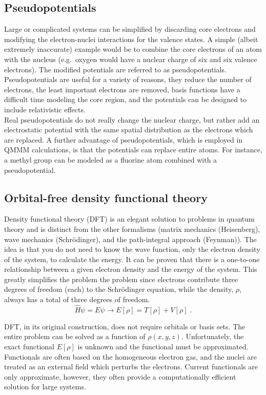 \documentclass[12pt]{report}
\begin{document}
\subsection{Pseudopotentials}

Large or complicated systems can be simplified by discarding core electrons
and modifying the electron-nuclei interactions for the valence states.
A simple (albeit extremely inaccurate) example would be to combine the core
electrons of an atom with the nucleus (e.g.\ oxygen would have a nuclear charge
of six and six valence electrons).
The modified potentials are referred to as pseudopotentials.
Pseudopotentials are useful for a variety of reasons, they reduce the number
of electrons, the least important electrons are removed, basis functions have
a difficult time modeling the core region, and the potentials can be designed
to include relativistic effects. \\

Real pseudopotentials do not really change the nuclear charge, but rather add
an electrostatic potential with the same spatial distribution as the electrons
which are replaced.
A further advantage of pseudopotentials, which is employed in QMMM
calculations, is that the potentials can replace entire atoms.
For instance, a methyl group can be modeled as a fluorine atom combined with a
pseudopotential.

\subsection{Orbital-free density functional theory}

Density functional theory (DFT) is an elegant solution to problems in quantum
theory and is distinct from the other formalisms (matrix mechanics
(Heisenberg), wave mechanics (Schr\"{o}dinger), and the path-integral approach
(Feynman)).
The idea is that you do not need to know the wave function, only the electron
density of the system, to calculate the energy.
It can be proven that there is a one-to-one relationship between a given
electron density and the energy of the system.
This greatly simplifies the problem the problem since electrons contribute
three degrees of freedom (each) to the Schr\"{o}dinger equation, while the
density, $\rho$, always has a total of three degrees of freedom.
\begin{equation}
 \hat H\psi=E\psi \to E[\rho] = T[\rho]+V[\rho] \; .
\end{equation}

DFT, in its original construction, does not require orbitals or basis sets.
The entire problem can be solved as a function of $\rho(x,y,z)$.
Unfortunately, the exact functional $E[\rho]$ is unknown and the functional
must be approximated.
Functionals are often based on the homogeneous electron gas, and the nuclei
are treated as an external field which perturbs the electrons.
Current functionals are only approximate, however, they often provide a
computationally efficient solution for large systems. \\
\end{document}
